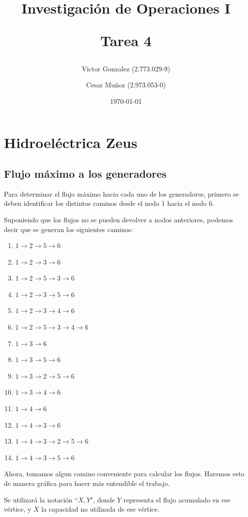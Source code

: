 \documentclass[12pt,letterpaper]{article}
\begin{document}
\title{Investigación de Operaciones I \\ \begin{Large}Tarea 4\end{Large}} 
\author{Victor Gonzalez (2.773.029-9)
\and Cesar Muñoz (2.973.053-0)}
\date{\today}
\maketitle

\section{Hidroeléctrica Zeus}
\subsection{Flujo máximo a los generadores}
Para determinar el flujo máximo hacia cada uno de los generadores, primero se deben identificar los distintos caminos desde el nodo 1 hacia el nodo 6.

Suponiendo que los flujos no se pueden devolver a nodos anteriores, podemos decir que se generan los siguientes caminos:

\begin{enumerate}
\item $1\to2\to5\to6$
\item $1\to2\to3\to6$
\item $1\to2\to5\to3\to6$
\item $1\to2\to3\to5\to6$
\item $1\to2\to3\to4\to6$
\item $1\to2\to5\to3\to4\to6$
\item $1\to3\to6$
\item $1\to3\to5\to6$
\item $1\to3\to2\to5\to6$
\item $1\to3\to4\to6$
\item $1\to4\to6$
\item $1\to4\to3\to6$
\item $1\to4\to3\to2\to5\to6$
\item $1\to4\to3\to5\to6$
\end{enumerate}

Ahora, tomamos algun camino conveniente para calcular los flujos. Haremos esto de manera gráfica para hacer más entendible el trabajo.

Se utilizará la notación ``$X,Y$", donde $Y$ representa el flujo acumulado en ese vértice, y $X$ la capacidad no utilizada de ese vértice.
\end{document}
